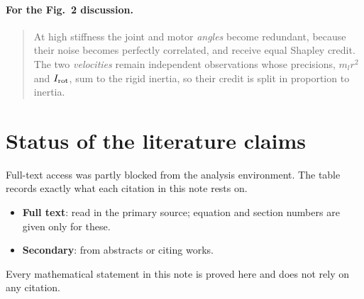 \documentclass[11pt]{article}
\theoremstyle{definition}
\theoremstyle{remark}
\begin{document}
\paragraph{For the Fig.~2 discussion.}
\begin{quote}\small
At high stiffness the joint and motor \emph{angles} become redundant, because their noise
becomes perfectly correlated, and receive equal Shapley credit. The two \emph{velocities}
remain independent observations whose precisions, $m_lr^2$ and $I_{\rm rot}$, sum to the
rigid inertia, so their credit is split in proportion to inertia.
\end{quote}

\section{Status of the literature claims}
\label{app:sources}

Full-text access was partly blocked from the analysis environment. The table records
exactly what each citation in this note rests on.
\begin{itemize}[nosep]
  \item \textbf{Full text}: read in the primary source; equation and section numbers are
        given only for these.
  \item \textbf{Secondary}: from abstracts or citing works.
\end{itemize}
Every mathematical statement in this note is proved here and does not rely on any
citation.
\end{document}
